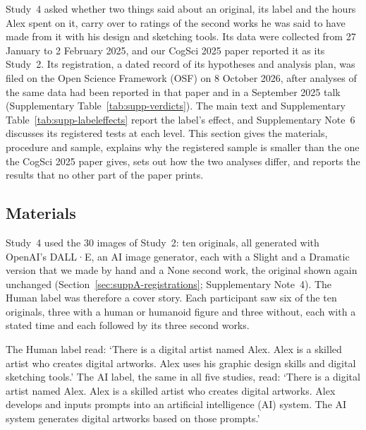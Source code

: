 \label{sec:suppB-study4}

Study~4 asked whether two things said about an original, its label and the hours Alex spent on it, carry over to ratings of the second works he was said to have made from it with his design and sketching tools. Its data were collected from 27 January to 2 February 2025, and our CogSci 2025 paper\cite{kamper2025originalsin} reported it as its Study~2. Its registration, a dated record of its hypotheses and analysis plan, was filed on the Open Science Framework (OSF) on 8 October 2026, after analyses of the same data had been reported in that paper and in a September 2025 talk (Supplementary Table~\ref{tab:supp-verdicts}). The main text and Supplementary Table~\ref{tab:supp-labeleffects} report the label's effect, and Supplementary Note~6 discusses its registered tests at each level. This section gives the materials, procedure and sample, explains why the registered sample is smaller than the one the CogSci 2025 paper gives, sets out how the two analyses differ, and reports the results that no other part of the paper prints.

\subsection*{Materials}

Study~4 used the 30 images of Study~2: ten originals, all generated with OpenAI's DALL·E, an AI image generator, each with a Slight and a Dramatic version that we made by hand and a None second work, the original shown again unchanged (Section~\ref{sec:suppA-registrations}; Supplementary Note~4). The Human label was therefore a cover story. Each participant saw six of the ten originals, three with a human or humanoid figure and three without, each with a stated time and each followed by its three second works.

The Human label read: `There is a digital artist named Alex. Alex is a skilled artist who creates digital artworks. Alex uses his graphic design skills and digital sketching tools.' The AI label, the same in all five studies, read: `There is a digital artist named Alex. Alex is a skilled artist who creates digital artworks. Alex develops and inputs prompts into an artificial intelligence (AI) system. The AI system generates digital artworks based on those prompts.'

